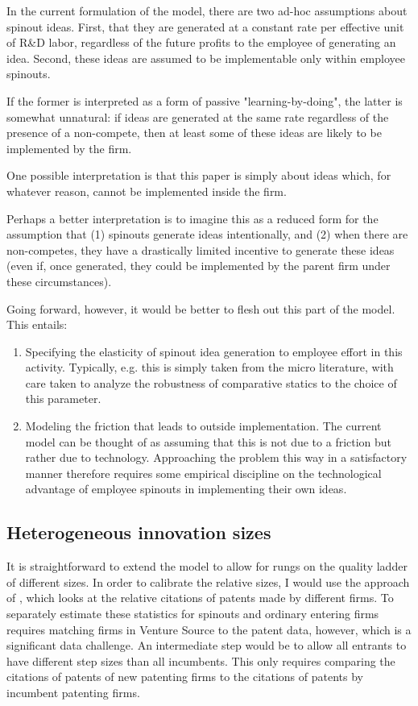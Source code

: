\documentclass[11pt,english]{article}
\theoremstyle{remark}
\begin{document}
In the current formulation of the model, there are two ad-hoc assumptions about spinout ideas. First, that they are generated at a constant rate per effective unit of R\&D labor, regardless of the future profits to the employee of generating an idea. Second, these ideas are assumed to be implementable only within employee spinouts. 

If the former is interpreted as a form of passive "learning-by-doing", the latter is somewhat unnatural: if ideas are generated at the same rate regardless of the presence of a non-compete, then at least some of these ideas are likely to be implemented by the firm.

One possible interpretation is that this paper is simply about ideas which, for whatever reason, cannot be implemented inside the firm. 

Perhaps a better interpretation is to imagine this as a reduced form for the assumption that (1) spinouts generate ideas intentionally, and (2) when there are non-competes, they have a drastically limited incentive to generate these ideas (even if, once generated, they could be implemented by the parent firm under these circumstances).

Going forward, however, it would be better to flesh out this part of the model. This entails: 

\begin{enumerate}
	\item Specifying the elasticity of spinout idea generation to employee effort in this activity. Typically, e.g. \cite{baslandze_spinout_2019} this is simply taken from the micro literature, with care taken to analyze the robustness of comparative statics to the choice of this parameter.
	\item Modeling the friction that leads to outside implementation. The current model can be thought of as assuming that this is not due to a friction but rather due to technology. Approaching the problem this way in a satisfactory manner therefore requires some empirical discipline on the technological advantage of employee spinouts in implementing their own ideas.
\end{enumerate}


\subsection{Heterogeneous innovation sizes}

It is straightforward to extend the model to allow for rungs on the quality ladder of different sizes. In order to calibrate the relative sizes, I would use the approach of \cite{akcigit_growth_2018}, which looks at the relative citations of patents made by different firms. To separately estimate these statistics for spinouts and ordinary entering firms requires matching firms in Venture Source to the patent data, however, which is a significant data challenge. An intermediate step would be to allow all entrants to have different step sizes than all incumbents. This only requires comparing the citations of patents of new patenting firms to the citations of patents by incumbent patenting firms. 
\end{document}
